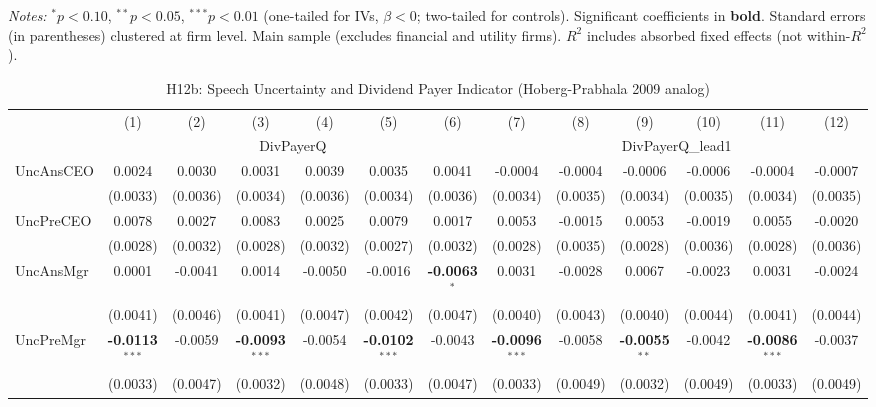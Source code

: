 \documentclass[11pt,a4paper]{article}
\begin{document}
\begin{table}[htbp]
\begin{tabular}{lcccccccccccc}
\bottomrule
\end{tabular}
\begin{minipage}{\linewidth}
\vspace{2pt}\scriptsize
\textit{Notes:} $^{*}p<0.10$, $^{**}p<0.05$, $^{***}p<0.01$ (one-tailed for IVs, $\beta < 0$; two-tailed for controls).
 Significant coefficients in \textbf{bold}.
 Standard errors (in parentheses) clustered at firm level.
 Main sample (excludes financial and utility firms).
 $R^2$ includes absorbed fixed effects (not within-$R^2$).
\end{minipage}
\end{table}
\clearpage
\begin{table}[htbp]
\centering
\caption{H12b: Speech Uncertainty and Dividend Payer Indicator (Hoberg-Prabhala 2009 analog)}
\label{tab:h12b}
\scriptsize
\begin{tabular}{lcccccccccccc}
\toprule
 & (1) & (2) & (3) & (4) & (5) & (6) & (7) & (8) & (9) & (10) & (11) & (12) \\
 & \multicolumn{6}{c}{DivPayerQ} & \multicolumn{6}{c}{DivPayerQ\_lead1} \\
\cmidrule(lr){2-7} \cmidrule(lr){8-13}
\midrule
UncAnsCEO & 0.0024 & 0.0030 & 0.0031 & 0.0039 & 0.0035 & 0.0041 & -0.0004 & -0.0004 & -0.0006 & -0.0006 & -0.0004 & -0.0007 \\
 & (0.0033) & (0.0036) & (0.0034) & (0.0036) & (0.0034) & (0.0036) & (0.0034) & (0.0035) & (0.0034) & (0.0035) & (0.0034) & (0.0035) \\
UncPreCEO & 0.0078 & 0.0027 & 0.0083 & 0.0025 & 0.0079 & 0.0017 & 0.0053 & -0.0015 & 0.0053 & -0.0019 & 0.0055 & -0.0020 \\
 & (0.0028) & (0.0032) & (0.0028) & (0.0032) & (0.0027) & (0.0032) & (0.0028) & (0.0035) & (0.0028) & (0.0036) & (0.0028) & (0.0036) \\
UncAnsMgr & 0.0001 & -0.0041 & 0.0014 & -0.0050 & -0.0016 & \textbf{-0.0063}$^{*}$ & 0.0031 & -0.0028 & 0.0067 & -0.0023 & 0.0031 & -0.0024 \\
 & (0.0041) & (0.0046) & (0.0041) & (0.0047) & (0.0042) & (0.0047) & (0.0040) & (0.0043) & (0.0040) & (0.0044) & (0.0041) & (0.0044) \\
UncPreMgr & \textbf{-0.0113}$^{***}$ & -0.0059 & \textbf{-0.0093}$^{***}$ & -0.0054 & \textbf{-0.0102}$^{***}$ & -0.0043 & \textbf{-0.0096}$^{***}$ & -0.0058 & \textbf{-0.0055}$^{**}$ & -0.0042 & \textbf{-0.0086}$^{***}$ & -0.0037 \\
 & (0.0033) & (0.0047) & (0.0032) & (0.0048) & (0.0033) & (0.0047) & (0.0033) & (0.0049) & (0.0032) & (0.0049) & (0.0033) & (0.0049) \\

\end{tabular}
\end{table}
\end{document}
